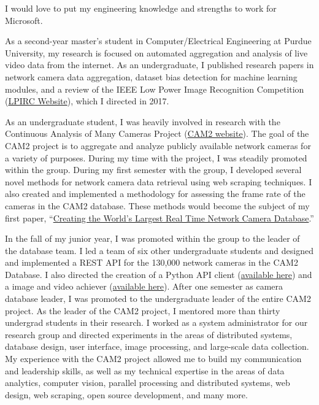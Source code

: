 \documentclass[10pt]{article}
\newcommand{\cvdurationstyle}[1]{{\small\cvdurationfont\textcolor{cvdurationcolor}{#1}}}
\newlength{\cvaftersectionskipamount}
\newcommand{\company}{Microsoft}
\newcommand{\job}{SOMEJOB}
\begin{document}

\vspace{4\cvaftersectionskipamount}

\noindent I would love to put my engineering knowledge and strengths to work for \company. 

\vspace{2\cvaftersectionskipamount}

As a second-year master's student in Computer/Electrical Engineering at Purdue University, my research is focused on automated aggregation and analysis of live video data from the internet. As an undergraduate, I published research papers in network camera data aggregation, dataset bias detection for machine learning modules, and a review of the IEEE Low Power Image Recognition Competition (\href{https://rebootingcomputing.ieee.org/lpirc}{LPIRC Website}), which I directed in 2017.  

As an undergraduate student, I was heavily involved in research with the Continuous Analysis of Many Cameras Project (\href{https://www.cam2project.net/}{CAM2 website}). The goal of the CAM2 project is to aggregate and analyze publicly available network cameras for a variety of purposes. During my time with the project, I was steadily promoted within the group. During my first semester with the group, I developed several novel methods for network camera data retrieval using web scraping techniques. I also created and implemented a methodology for assessing the frame rate of the cameras in the CAM2 database. These methods would become the subject of my first paper, “\href{https://drive.google.com/open?id=1479pCURB0qsDXMOfdWBarYYTbIyrDcYf}{Creating the World's Largest Real Time Network Camera Database}.”  

In the fall of my junior year, I was promoted within the group to the leader of the database team. I led a team of six other undergraduate students and designed and implemented a REST API for the 130,000 network cameras in the CAM2 Database. I also directed the creation of a Python API client (\href{https://github.com/PurdueCAM2Project/CameraDatabaseClient}{available here}) and a image and video achiever (\href{https://github.com/PurdueCAM2Project/CAM2ImageArchiver}{available here}). After one semester as camera database leader, I was promoted to the undergraduate leader of the entire CAM2 project. As the leader of the CAM2 project, I mentored more than thirty undergrad students in their research. I worked as a system administrator for our research group and directed experiments in the areas of distributed systems, database design, user interface, image processing, and large-scale data collection. My experience with the CAM2 project allowed me to build my communication and leadership skills, as well as my technical expertise in the areas of data analytics, computer vision, parallel processing and distributed systems, web design, web scraping, open source development, and many more. 
\end{document}
